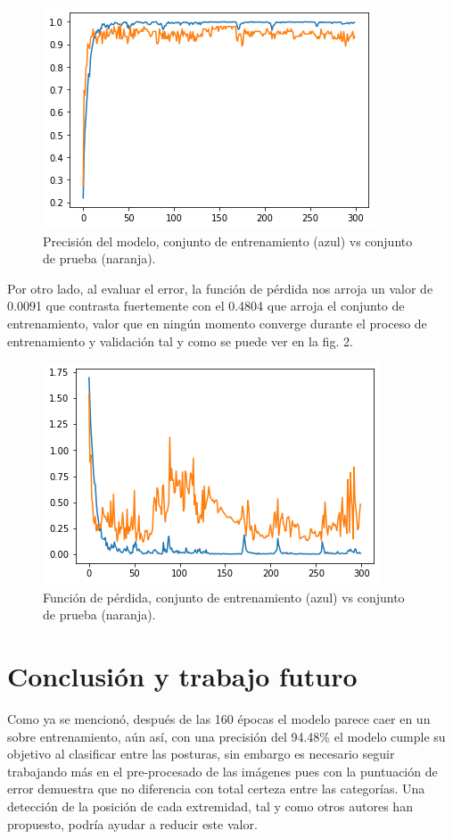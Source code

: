 \documentclass[journal]{IEEEtran}
\begin{document}
\begin{figure}[htbp]
    \centering
    \includegraphics[width=0.8\columnwidth]{5x5-3convlayers300epochs.png}
    \caption{Precisión del modelo, conjunto de entrenamiento (azul) vs conjunto de prueba (naranja).}
    \label{fig:acurracy}
\end{figure}

Por otro lado, al evaluar el error, la función de pérdida nos arroja un valor de 0.0091 que contrasta fuertemente con el 0.4804 que arroja el conjunto de entrenamiento, valor que en ningún momento converge durante el proceso de entrenamiento y validación tal y como se puede ver en la fig. 2. 

\begin{figure}[htbp]
    \centering
    \includegraphics[width=0.8\columnwidth]{loss-5x5-3convlayers300epochs.png}
    \caption{Función de pérdida, conjunto de entrenamiento (azul) vs conjunto de prueba (naranja).}
    \label{fig:loss}
\end{figure}

\section{Conclusión y trabajo futuro}
Como ya se mencionó, después de las 160 épocas el modelo parece caer en un sobre entrenamiento, aún así, con una precisión del 94.48\% el modelo cumple su objetivo al clasificar entre las posturas, sin embargo es necesario seguir trabajando más en el pre-procesado de las imágenes pues con la puntuación de error demuestra que no diferencia con total certeza entre las categorías. Una detección de la posición de cada extremidad, tal y como otros autores han propuesto, podría ayudar a reducir este valor. 
\end{document}
